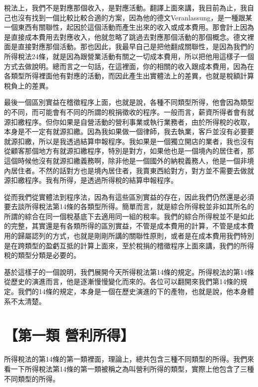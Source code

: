 \documentclass[]{ctexbook}
\begin{document}
稅法上，我們不是對應那個收入，是對應活動。翻譯上面來講，我目前為止，我自己也沒有找到一個比較比較合適的方案，因為他的德文Veranlassung，是一種跟某一個東西有關聯性，起因於這個活動而產生出來的收入或成本費用。那會計上因為是直接成本費用去對應收入，他就忽略了跳過去對應那個活動的那個概念。德文裡面是直接對應那個活動。那也因此，我最早自己是把他翻成關聯性，是因為我們的所得稅法24條，就是因為跟營業活動有關之一切成本費用，所以把他用這樣子一個方式去做說明。總而言之一句話，在這裡面，你的相關的收入跟成本費用，因為在各類型所得裡面他有對應的活動，而因此產生出實體法上的差異，也就是稅額計算稅負上的差異。

最後一個區別實益在稽徵程序上面，也就是說，各種不同類型所得，他會因為類型的不同，而可能會有不同的所謂的稅捐徵收的程序。一般而言，薪資所得者會有就源扣繳程序。但你如果是自營活動的營利事業或執行業務者，由於所得稅的收取，本身是不一定有就源扣繳。因為我如果做一個律師，我去執業，客戶並沒有必要要就源扣繳，所以是我透過結算申報程序。我如果是一個獨立開店的業者，我也沒有從顧客那個地方有就源扣繳程序，特別是對方，如果他也是一個境內的居住者，那這個時候他沒有就源扣繳義務啊，除非他是一個國外的納稅義務人，他是一個非境內居住者。不然的話對方也是境內居住者，我賣東西給對方，對方並不需要去做就源扣繳程序。我有所得，是透過所得稅的結算申報程序。

從而我們從實體法到程序法，因為有這些區別實益的存在，因此我們仍然還是必須要去談所得稅法第14條的各類型所得。簡單而言，就是綜合所得稅並非如其所名的所謂的綜合在同一個稅基底下去適用同一組的稅率。我們的綜合所得稅並不是如此的完整，其實還是有各類所得的區別實益，不管是成本費用的計算，不管是成本費用的歸屬認列的方式，也就是剛剛所講的關聯性原則，或者是在成本費用我們特別是在跨類型的盈虧互抵的計算上面來，至於稅捐的稽徵程序上面來講，我們的所得稅的類型分類是必要的。

基於這樣子的一個說明，我們展開今天所得稅法第14條的規定。所得稅法的第14條從歷史的演進而言，他是逐漸慢慢變化而來的。各位可以翻開來我們第14條的規定。我們的14條的規定，本身是一個在歷史演進的下的產物，也就是說，他本身體系不太清楚。

\hypertarget{ux7b2cux4e00ux985e-ux71dfux5229ux6240ux5f97}{%
\section{【第一類 營利所得】}\label{ux7b2cux4e00ux985e-ux71dfux5229ux6240ux5f97}}

所得稅法的第14條的第一類裡面，理論上，總共包含三種不同類型的所得。我們來看一下所得稅法第14條的第一類被稱之為叫營利所得的類型，實際上他包含了三種不同類型的所得。
\end{document}
